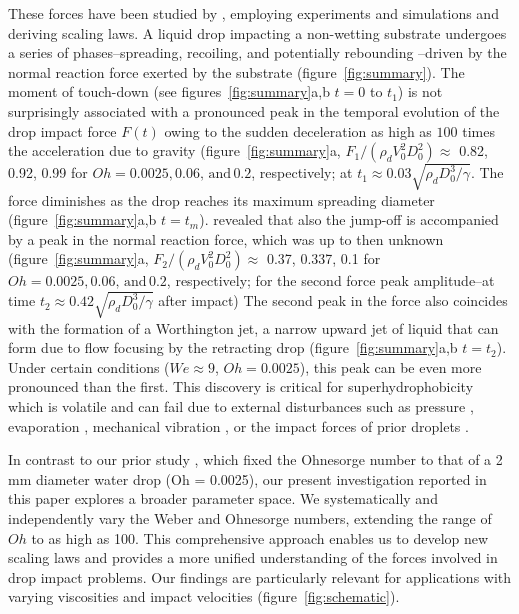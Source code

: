 \documentclass{jfm}
\begin{document}
	These forces have been studied by \citet{zhang2022impact}, employing experiments and simulations and deriving scaling laws. 
	A liquid drop impacting a non-wetting substrate undergoes a series of phases--spreading, recoiling, and potentially rebounding \citep{chantelot2018rebonds}--driven by the normal reaction force exerted by the substrate (figure~\ref{fig:summary}). 
	The moment of touch-down (see figures~\ref{fig:summary}a,b $t = 0$ to $t_1$) \citep{wagner1932stoss, Philippi2016, Gordillo2018} is not surprisingly associated with a pronounced peak in the temporal evolution of the drop impact force $F(t)$ owing to the sudden deceleration as high as $100$ times the acceleration due to gravity \citep{Clanet2004} (figure~\ref{fig:summary}a, $F_1/(\rho_dV_0^2D_0^2) \approx$ 0.82, 0.92, 0.99 for $Oh = 0.0025, 0.06,\,\text{and}\,0.2$, respectively; at $t_1 \approx 0.03\sqrt{\rho_dD_0^3/\gamma}$.
	The force diminishes as the drop reaches its maximum spreading diameter (figure~\ref{fig:summary}a,b $t = t_m$). 
	\citet{zhang2022impact} revealed that also the jump-off is accompanied by a peak in the normal reaction force, which was up to then unknown (figure~\ref{fig:summary}a, 
	$F_2/(\rho_dV_0^2D_0^2) \approx$ 0.37, 0.337, 0.1 for $Oh = 0.0025, 0.06,\,\text{and}\,0.2$, respectively; for the second force peak amplitude--at time $t_2 \approx 0.42\sqrt{\rho_dD_0^3/\gamma}$ after impact)
	The second peak in the force also coincides with the formation of a Worthington jet, a narrow upward jet of liquid that can form due to flow focusing by the retracting drop (figure~\ref{fig:summary}a,b $t = t_2$). Under certain conditions ($We \approx 9$, $Oh = 0.0025$), this peak can be even more pronounced than the first. This discovery is critical for superhydrophobicity which is volatile and can fail due to external disturbances such as pressure \citep{Lafuma2003, Callies2005, Sbragaglia2007, Li2017}, evaporation \citep{Tsai2010, Chen2012, Papadopoulos2013},  mechanical vibration \citep{Bormashenko2007}, or the impact forces of prior droplets \citep{Bartolo2006Bouncing}.   
	
	In contrast to our prior study \citet{zhang2022impact}, which fixed the Ohnesorge number to that of a 2 mm diameter water drop (Oh = 0.0025), our present investigation reported in this paper explores a broader parameter space. We systematically and independently vary the Weber and Ohnesorge numbers, extending the range of $Oh$ to as high as 100. This comprehensive approach enables us to develop new scaling laws and provides a more unified understanding of the forces involved in drop impact problems. Our findings are particularly relevant for applications with varying viscosities and impact velocities (figure~\ref{fig:schematic}). 
	
\end{document}
